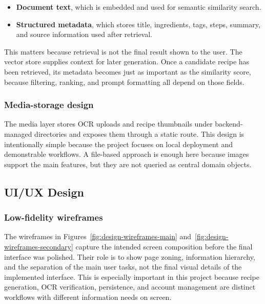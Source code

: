 \begin{itemize}
	\item \textbf{Document text}, which is embedded and used for semantic
	similarity search.
	\item \textbf{Structured metadata}, which stores title, ingredients,
	tags, steps, summary, and source information used after retrieval.
\end{itemize}

This matters because retrieval is not the final result shown to the
user. The vector store supplies context for later generation. Once a
candidate recipe has been retrieved, its metadata becomes just as
important as the similarity score, because filtering, ranking, and
prompt formatting all depend on those fields.

\subsubsection{Media-storage design}

The media layer stores OCR uploads and recipe thumbnails under
backend-managed directories and exposes them through a static route.
This design is intentionally simple because the project focuses on local
deployment and demonstrable workflows. A file-based approach is enough
here because images support the main features, but they are not queried
as central domain objects.

\subsection{UI/UX Design}

\subsubsection{Low-fidelity wireframes}

The wireframes in Figures~\ref{fig:design-wireframes-main}
and~\ref{fig:design-wireframes-secondary} capture the intended screen
composition before the final interface was polished. Their role is to
show page zoning, information hierarchy, and the separation of the main
user tasks, not the final visual details of the implemented interface.
This is especially important in this project because recipe generation,
OCR verification, persistence, and account management are distinct
workflows with different information needs on screen.

